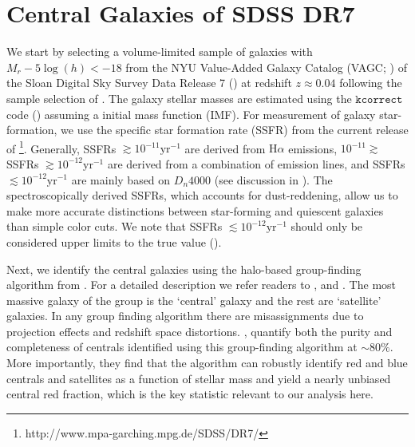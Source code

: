 \documentclass[iop,apj,tighten,twocolappendix,numberedappendix]{emulateapj}
\begin{document}
\section{Central Galaxies of SDSS DR7} \label{sec:sdss}
We start by selecting a volume-limited sample of galaxies with  $M_r - 5\log(h) < -18$ from the NYU Value-Added Galaxy Catalog (VAGC; 
\citealt{Blanton:2005aa}) of the Sloan Digital Sky Survey Data Release 7
(\citealt{Abazajian:2009aa}) at redshift $z \approx 0.04$ following the 
sample selection of \cite{Tinker:2011aa}. 
The galaxy stellar masses are estimated using the $\mathtt{kcorrect}$ 
code (\citealt{Blanton:2007aa}) assuming a \cite{Chabrier:2003aa} initial 
mass function (IMF). For measurement of galaxy star-formation, we use the 
specific star formation rate (SSFR) from the current release of \cite{Brinchmann:2004aa}
\footnote{http://www.mpa-garching.mpg.de/SDSS/DR7/}. Generally, SSFRs 
$\gtrsim 10^{-11} \mathrm{yr}^{-1}$ are derived from $\mathrm{H}\alpha$ 
emissions, $10^{-11}\gtrsim$ SSFRs $\gtrsim 10^{-12} \mathrm{yr}^{-1}$ 
are derived from a combination of emission lines, and SSFRs
$\lesssim 10^{-12} \mathrm{yr}^{-1}$ are mainly based on $D_n4000$ 
(see discussion in \citealt{Wetzel:2013aa}). 
The spectroscopically derived SSFRs, which accounts for dust-reddening, 
allow us to make more accurate distinctions between star-forming and 
quiescent galaxies than simple color cuts. We note that SSFRs 
$\lesssim 10^{-12} \mathrm{yr}^{-1}$ should only be considered upper 
limits to the true value (\citealt{Salim:2007aa}).  

Next, we identify the central galaxies using the halo-based group-finding 
algorithm from \cite{Tinker:2011aa}. For a detailed description we refer
readers to \cite{Tinker:2011aa, Wetzel:2012aa, Wetzel:2013aa, Wetzel:2014aa}, 
and \cite{Tinker:2016ab}. 
The most massive galaxy of the group is the `central' galaxy and 
the rest are `satellite' galaxies. In any group finding algorithm 
there are misassignments due to projection effects and redshift 
space distortions. \cite{Campbell:2015aa}, quantify both the purity and 
completeness of centrals identified using this group-finding algorithm
at $\sim 80\%$. More importantly, they find that the algorithm 
can robustly identify red and blue centrals and satellites as a 
function of stellar mass and yield a nearly unbiased central red 
fraction, which is the key statistic relevant to our analysis here. 
\end{document}

